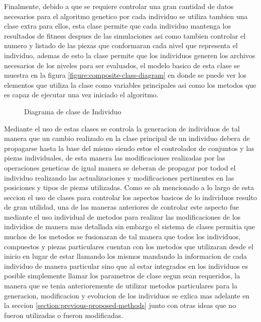 Finalmente, debido a que se requiere controlar una gran cantidad de datos
necesarios para el algoritmo genetico por cada individuo se utiliza tambien una
clase extra para ellos, esta clase permite que cada individuo mantenga los
resultados de fitness despues de las simulaciones asi como tambien controlar el
numero y listado de las piezas que conformaran cada nivel que representa el
individuo, ademas de esto la clase permite que los individuos generen los
archivos necesarios de los niveles para ser evaluados, el modelo basico de esta
clase se muestra en la figura \ref{figure:composite-class-diagram} en donde se
puede ver los elementos que utiliza la clase como variables principales asi como
los metodos que es capaz de ejecutar una vez iniciado el algoritmo.

\begin{figure}
  \centering
  \scalebox{.65}{}
  \caption{Diagrama de clase de Individuo}
  \label{figure:individual-class-diagram}
\end{figure}

Mediante el uso de estas clases se controla la generacion de individuos de tal
manera que un cambio realizado en la clase principal de un individuo debera de
propagarse hasta la base del mismo siendo estos el controlador de conjuntos y
las piezas individuales, de esta manera las modificaciones realizadas por las
operaciones geneticas de igual manera se deberan de propagar por todod el
individuo realizando las actualizaciones y modificaciones pertinentes en las
posiciones y tipos de piezas utilizadas. Como se ah mencionado a lo largo de
esta seccion el uso de clases para controlar los aspectos basicos de lo
individuos resulto de gran utilidad, una de las maneras anteriores de controlar
este aspecto fue mediante el uso individual de metodos para realizar las
modificaciones de los individios de manera mas detallada sin embargo el sistema
de clases permitia que muchos de los metodos se fusionaran de tal manera que
todos los individuos, compuestos y piezas particulares cuentan con los metodos
que utilizaran desde el inicio en lugar de estar llamando los mismos mandando la
informacion de cada individuo de manera particular sino que al estar integrados
en los individuos es posible simplemente llamar los parametros de clase segun
sean requeridos, la manera que se tenia anterioremente de utilizar metodos
particulares para la generacion, modificacion y evolucion de los individuos se
exlica mas adelante en la seccion \ref{section:previous-proposed-methods} junto
con otras ideas que no fueron utilizadas o fueron modificadas.


